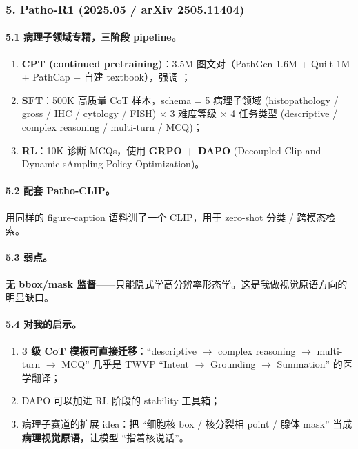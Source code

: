 \subsubsection*{5. Patho-R1 (2025.05 / arXiv 2505.11404)}

\paragraph{5.1 病理子领域专精，三阶段 pipeline。}

\begin{enumerate}[leftmargin=1.5em]
  \item \textbf{CPT (continued pretraining)}：3.5M 图文对（PathGen-1.6M + Quilt-1M + PathCap + 自建 textbook），强调 ；
  \item \textbf{SFT}：500K 高质量 CoT 样本，schema = 5 病理子领域 (histopathology / gross / IHC / cytology / FISH) $\times$ 3 难度等级 $\times$ 4 任务类型 (descriptive / complex reasoning / multi-turn / MCQ)；
  \item \textbf{RL}：10K 诊断 MCQs，使用 \textbf{GRPO + DAPO} (Decoupled Clip and Dynamic sAmpling Policy Optimization)。
\end{enumerate}

\paragraph{5.2 配套 Patho-CLIP。}
用同样的 figure-caption 语料训了一个 CLIP，用于 zero-shot 分类 / 跨模态检索。

\paragraph{5.3 弱点。}
\textbf{无 bbox/mask 监督}——只能隐式学高分辨率形态学。这是我做视觉原语方向的明显缺口。

\paragraph{5.4 对我的启示。}

\begin{enumerate}[leftmargin=1.5em]
  \item \textbf{3 级 CoT 模板可直接迁移}：``descriptive $\to$ complex reasoning $\to$ multi-turn $\to$ MCQ'' 几乎是 TWVP ``Intent $\to$ Grounding $\to$ Summation'' 的医学翻译；
  \item DAPO 可以加进 RL 阶段的 stability 工具箱；
  \item 病理子赛道的扩展 idea：把 ``细胞核 box / 核分裂相 point / 腺体 mask'' 当成 \textbf{病理视觉原语}，让模型 ``指着核说话''。
\end{enumerate}

